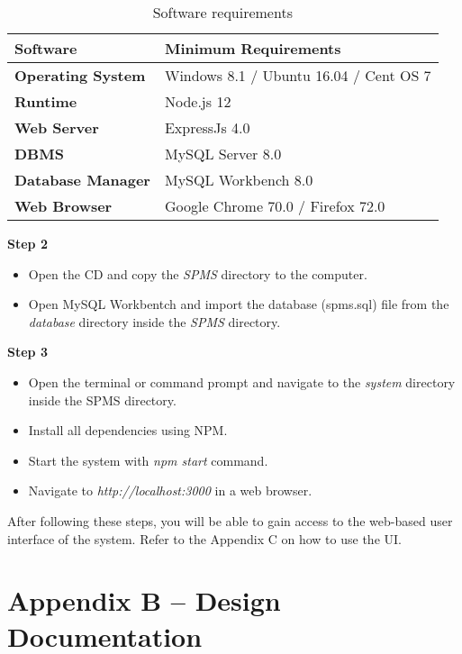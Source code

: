 \documentclass[12pt]{report}
\begin{document}
\begin{table}[H]
	\centering
	\begin{tabular}{ | p{2.5cm} | p{8.5cm} |}
		\hline
		\bf{Software}         & \bf{Minimum Requirements}              \\
		\hline
		\bf{Operating System} & Windows 8.1 / Ubuntu 16.04 / Cent OS 7 \\
		\hline
		\bf{Runtime}          & Node.js 12                             \\
		\hline
		\bf{Web Server}       & ExpressJs  4.0                         \\
		\hline
		\bf{DBMS}             & MySQL Server 8.0                       \\
		\hline
		\bf{Database Manager} & MySQL Workbench 8.0                    \\
		\hline
		\bf{Web Browser}      & Google Chrome 70.0 / Firefox   72.0    \\
		\hline
	\end{tabular}
	\caption{Software requirements}
\end{table}

\noindent
\large{\bf{Step 2}}
\begin{itemize}
	\item Open the CD and copy the {\it{SPMS}} directory to the computer.
	\item Open MySQL Workbentch and import the database (spms.sql) file from the {\it{database}} directory inside the {\it{SPMS}} directory.
\end{itemize}

\noindent
\large{\bf{Step 3}}
\begin{itemize}
	\item Open the terminal or command prompt and navigate to the {\it{system}} directory inside the SPMS directory.
	\item Install all dependencies using NPM.
	\item Start the system with {\it{npm start}} command.
	\item Navigate to {\it{http://localhost:3000}} in a web browser.
\end{itemize}

After following these steps, you will be able to gain access to the web-based user interface of the system. Refer to the Appendix C on how to use the UI.

\setcounter{chapter}{2}
\setcounter{section}{0}
\setcounter{figure}{0}
\chapter*{\Huge Appendix B – Design Documentation}
\end{document}
